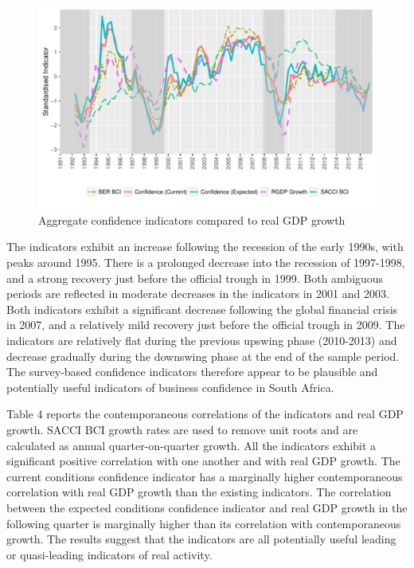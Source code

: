 \documentclass[11pt,]{article}
\begin{document}
\begin{figure}
\centering
\includegraphics{BCon_5_Journal_files/figure-latex/figure2-1.pdf}
\caption{Aggregate confidence indicators compared to real GDP growth}
\end{figure}

The indicators exhibit an increase following the recession of the early
1990s, with peaks around 1995. There is a prolonged decrease into the
recession of 1997-1998, and a strong recovery just before the official
trough in 1999. Both ambiguous periods are reflected in moderate
decreases in the indicators in 2001 and 2003. Both indicators exhibit a
significant decrease following the global financial crisis in 2007, and
a relatively mild recovery just before the official trough in 2009. The
indicators are relatively flat during the previous upswing phase
(2010-2013) and decrease gradually during the downswing phase at the end
of the sample period. The survey-based confidence indicators therefore
appear to be plausible and potentially useful indicators of business
confidence in South Africa.

Table 4 reports the contemporaneous correlations of the indicators and
real GDP growth. SACCI BCI growth rates are used to remove unit roots
and are calculated as annual quarter-on-quarter growth. All the
indicators exhibit a significant positive correlation with one another
and with real GDP growth. The current conditions confidence indicator
has a marginally higher contemporaneous correlation with real GDP growth
than the existing indicators. The correlation between the expected
conditions confidence indicator and real GDP growth in the following
quarter is marginally higher than its correlation with contemporaneous
growth. The results suggest that the indicators are all potentially
useful leading or quasi-leading indicators of real activity.
\end{document}
